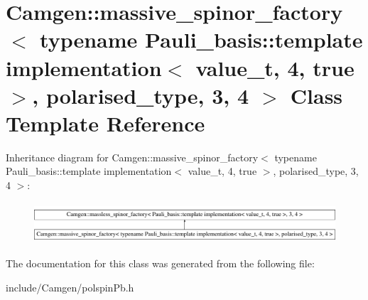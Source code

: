 \hypertarget{a00351}{}\section{Camgen\+:\+:massive\+\_\+spinor\+\_\+factory$<$ typename Pauli\+\_\+basis\+:\+:template implementation$<$ value\+\_\+t, 4, true $>$, polarised\+\_\+type, 3, 4 $>$ Class Template Reference}
\label{a00351}
Inheritance diagram for Camgen\+:\+:massive\+\_\+spinor\+\_\+factory$<$ typename Pauli\+\_\+basis\+:\+:template implementation$<$ value\+\_\+t, 4, true $>$, polarised\+\_\+type, 3, 4 $>$\+:\begin{figure}[H]
\begin{center}
\leavevmode
\includegraphics[height=1.538461cm]{a00351}
\end{center}
\end{figure}


The documentation for this class was generated from the following file\+:\begin{DoxyCompactItemize}
\item 
include/\+Camgen/polspin\+Pb.\+h\end{DoxyCompactItemize}
